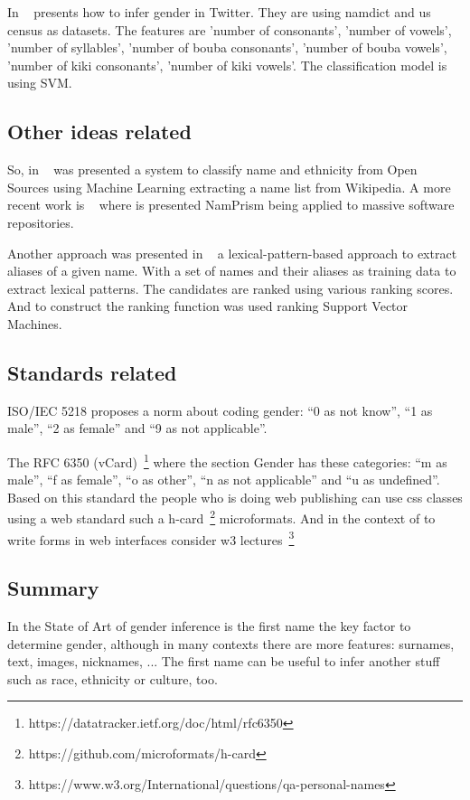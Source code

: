 \documentclass[a4paper]{article}
\begin{document}
In ~\cite{mueller2016gender} presents how to infer gender in
Twitter. They are using namdict and us census as datasets. The
features are 'number of consonants', 'number of vowels', 'number of
syllables', 'number of bouba consonants', 'number of bouba vowels',
'number of kiki consonants', 'number of kiki vowels'. The
classification model is using SVM.

\subsection{Other ideas related}

So, in ~\cite{ambekar2009name} was presented a system to classify name
and ethnicity from Open Sources using Machine Learning extracting a
name list from Wikipedia. A more recent work is
~\cite{nadri2021relationship} where is presented NamPrism being
applied to massive software repositories.

Another approach was presented in ~\cite{bollegala2010automatic} a
lexical-pattern-based approach to extract aliases of a given
name. With a set of names and their aliases as training data to
extract lexical patterns. The candidates are ranked using various
ranking scores. And to construct the ranking function was used
ranking Support Vector Machines.

\subsection{Standards related}

ISO/IEC 5218 proposes a norm about coding gender: ``0 as not know'',
``1 as male'', ``2 as female'' and ``9 as not applicable''.

The RFC 6350
(vCard)~\footnote{https://datatracker.ietf.org/doc/html/rfc6350}
where the section Gender has these categories: ``m as male'', ``f as
female'', ``o as other'', ``n as not applicable'' and ``u as
undefined''. Based on this standard the people who is doing web
publishing can use css classes using a web standard such a
h-card~\footnote{https://github.com/microformats/h-card}
microformats. And in the context of to write forms in web interfaces
consider w3
lectures~\footnote{https://www.w3.org/International/questions/qa-personal-names}

\subsection{Summary}

In the State of Art of gender inference is the first name the key
factor to determine gender, although in many contexts there are more
features: surnames, text, images, nicknames, ... The first name can be
useful to infer another stuff such as race, ethnicity or culture, too.
\end{document}
